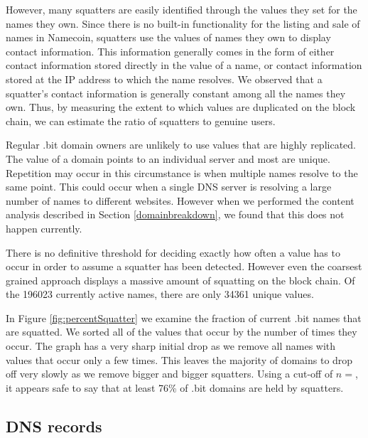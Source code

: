 However, many squatters are easily identified through the values they set for the names they own. Since there is no built-in functionality for the listing and sale of names in Namecoin, squatters use the values of names they own to display contact information. This information generally comes in the form of either contact information stored directly in the value of a name, or contact information stored at the IP address to which the name resolves.  We observed that a squatter's contact information is generally constant among all the names they own. Thus, by measuring the extent to which values are duplicated on the block chain, we can estimate the ratio of squatters to genuine users.

Regular .bit domain owners are unlikely to use values that are highly replicated. The value of a domain points to an individual server and most are unique. Repetition may occur in this circumstance is when multiple names resolve to the same point. This could occur when a single DNS server is resolving a large number of names to different websites. However when we performed the content analysis described in Section \ref{domainbreakdown}, we found that this does not happen currently.

There is no definitive threshold for deciding exactly how often a value has to occur in order to assume a squatter has been detected. However even the coarsest grained approach displays a massive amount of squatting on the block chain. Of the 196023 currently active names, there are only 34361 unique values.

In Figure \ref{fig:percentSquatter} we examine the fraction of current .bit names that are squatted. We sorted all of the values that occur by the number of times they occur. 
The graph has a very sharp initial drop as we remove all names with values that occur only a few times. This leaves the majority of domains to drop off very slowly as we remove bigger and bigger squatters. Using a cut-off of $n=$, it appears safe to say that at least 76\% of .bit domains are held by squatters.

\subsection{DNS records}

